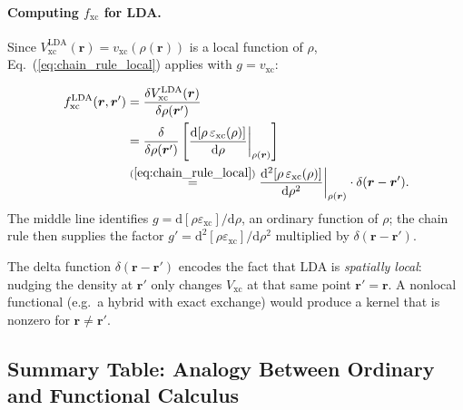 \documentclass[12pt,letterpaper]{article}
\newcommand{\dd}{\mathrm{d}}
\newcommand{\Vxc}{V_{\mathrm{xc}}}
\newcommand{\fxc}{f_{\mathrm{xc}}}
\theoremstyle{definition}
\begin{document}
\paragraph{Computing $\fxc$ for LDA.}
Since $\Vxc^{\mathrm{LDA}}(\bm{r}) = v_\text{xc}(\rho(\bm{r}))$ is a local function
of $\rho$, Eq.~(\ref{eq:chain_rule_local}) applies with $g = v_\text{xc}$:
\begin{derivbox}
\begin{align}
  \fxc^{\mathrm{LDA}}(\bm{r},\bm{r}')
  &= \frac{\delta\Vxc^{\mathrm{LDA}}(\bm{r})}{\delta\rho(\bm{r}')} \notag\\
  &= \frac{\delta}{\delta\rho(\bm{r}')}\left[
    \frac{\dd[\rho\,\varepsilon_{\mathrm{xc}}(\rho)]}{\dd\rho}
    \bigg|_{\rho(\bm{r})}
    \right] \notag\\
  &\overset{(\ref{eq:chain_rule_local})}{=}
    \frac{\dd^2[\rho\,\varepsilon_{\mathrm{xc}}(\rho)]}{\dd\rho^2}
    \bigg|_{\rho(\bm{r})}
    \cdot\delta(\bm{r}-\bm{r}').
  \label{eq:fxc_lda_full}
\end{align}
The middle line identifies $g = \dd[\rho\varepsilon_{\mathrm{xc}}]/\dd\rho$,
an ordinary function of $\rho$; the chain rule then supplies the factor
$g' = \dd^2[\rho\varepsilon_{\mathrm{xc}}]/\dd\rho^2$ multiplied by
$\delta(\bm{r}-\bm{r}')$.
\end{derivbox}

\noindent The delta function $\delta(\bm{r}-\bm{r}')$ encodes the fact that
LDA is \emph{spatially local}: nudging the density at $\bm{r}'$ only changes
$\Vxc$ at that same point $\bm{r}' = \bm{r}$.
A nonlocal functional (e.g.\ a hybrid with exact exchange) would produce a
kernel that is nonzero for $\bm{r}\neq\bm{r}'$.

\subsection{Summary Table: Analogy Between Ordinary and Functional Calculus}
\end{document}

